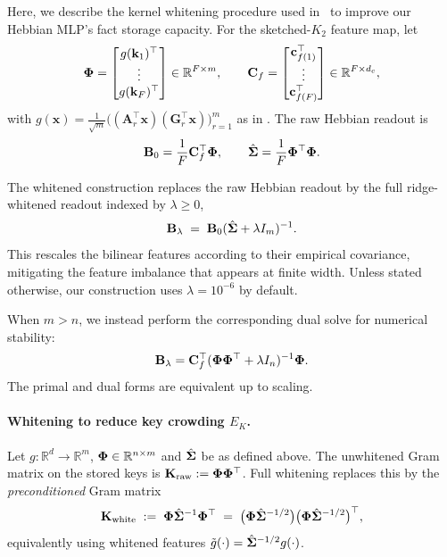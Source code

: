 Here, we describe the kernel whitening procedure used in~ to improve our Hebbian MLP's fact storage capacity. For the sketched-$K_{2}$ feature map, let
\[
{\bm{\Phi}}=
\begin{bmatrix}
g({\mathbf{k}}_{1})^\top\\
\vdots\\
g({\mathbf{k}}_{F})^\top
\end{bmatrix}\in\mathbb{R}^{F\times m},
\qquad
\mathbf{C}_{f}=
\begin{bmatrix}
{\mathbf{c}}_{f(1)}^\top\\
\vdots\\
{\mathbf{c}}_{f(F)}^\top
\end{bmatrix}\in\mathbb{R}^{F\times d_c},
\]
with $g(\mathbf{x})=\frac{1}{\sqrt m}\big((\mathbf{A}_{r}^\top \mathbf{x})(\mathbf{G}_{r}^\top \mathbf{x})\big)_{r=1}^m$ as in
. The raw Hebbian readout is
\begin{equation}
\mathbf{B}_{0}=\frac{1}{F}\mathbf{C}_{f}^\top{\bm{\Phi}},
\qquad
\hat{{\bm{\Sigma}}}=\frac{1}{F}{\bm{\Phi}}^\top{\bm{\Phi}}.
\label{eq:app:whitening:raw}
\end{equation}

The whitened construction replaces the raw Hebbian readout by the full ridge-whitened readout indexed by $\lambda\ge 0$,
\begin{equation}
\mathbf{B}_{\lambda}
\;=\;
\mathbf{B}_{0}(\hat{{\bm{\Sigma}}}+\lambda I_{m})^{-1}.
\label{eq:app:whitening:full_primal}
\end{equation}
This rescales the bilinear features according to their empirical covariance, mitigating the feature imbalance that appears at finite width. Unless stated otherwise, our construction uses $\lambda=10^{-6}$ by default.

When $m>n$, we instead perform the corresponding dual solve for numerical stability:
\begin{equation}
\mathbf{B}_{\lambda}
=
\mathbf{C}_{f}^\top({\bm{\Phi}}{\bm{\Phi}}^\top+\lambda I_{n})^{-1}{\bm{\Phi}}.
\label{eq:app:whitening:full_dual}
\end{equation}
The primal and dual forms are equivalent up to scaling.

\paragraph{Whitening to reduce key crowding $E_{K}$.} \label{app:theory:margin_bounds:kernel_whitening_crowding}
Let $g:\mathbb{R}^d\to\mathbb{R}^m$, ${\bm{\Phi}}\in\mathbb{R}^{n\times m}$ and $\hat{{\bm{\Sigma}}}$ be as defined above.
The unwhitened Gram matrix on the stored keys is $\mathbf{K}_{\mathrm{raw}} := {\bm{\Phi}}{\bm{\Phi}}^\top$.
Full whitening replaces this by the \emph{preconditioned} Gram matrix
\[
\mathbf{K}_{\mathrm{white}} \;:=\; {\bm{\Phi}} \hat{{\bm{\Sigma}}}^{-1}{\bm{\Phi}}^\top
\;=\; \big({\bm{\Phi}}\hat{{\bm{\Sigma}}}^{-1/2}\big)\big({\bm{\Phi}}\hat{{\bm{\Sigma}}}^{-1/2}\big)^\top ,
\]
equivalently using whitened features $\tilde g(\cdot)=\hat{{\bm{\Sigma}}}^{-1/2}g(\cdot)$.

